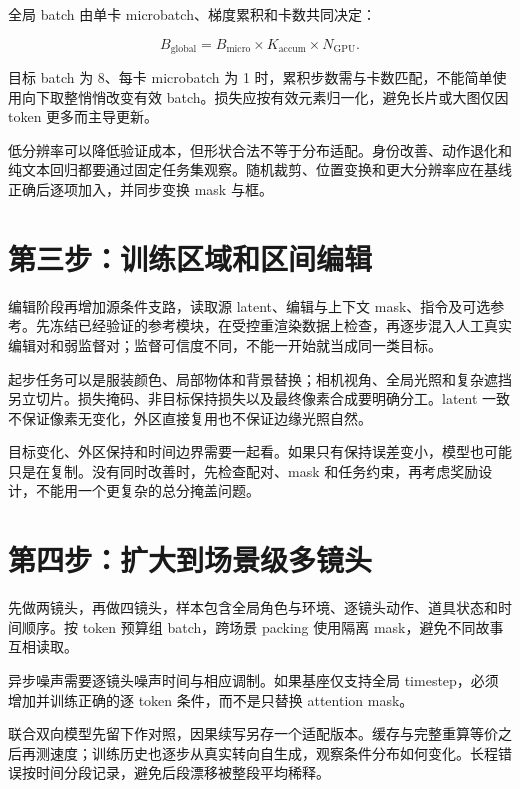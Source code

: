 全局 batch 由单卡 microbatch、梯度累积和卡数共同决定：

\[
B_{\mathrm{global}}=B_{\mathrm{micro}}\times K_{\mathrm{accum}}\times N_{\mathrm{GPU}}.
\]

目标 batch 为 8、每卡 microbatch 为 1 时，累积步数需与卡数匹配，不能简单使用向下取整悄悄改变有效 batch。损失应按有效元素归一化，避免长片或大图仅因 token 更多而主导更新。

低分辨率可以降低验证成本，但形状合法不等于分布适配。身份改善、动作退化和纯文本回归都要通过固定任务集观察。随机裁剪、位置变换和更大分辨率应在基线正确后逐项加入，并同步变换 mask 与框。

\section{第三步：训练区域和区间编辑}\label{seedance-m13-ux7b2cux4e09ux6b65ux8badux7ec3ux533aux57dfux548cux533aux95f4ux7f16ux8f91}

编辑阶段再增加源条件支路，读取源 latent、编辑与上下文 mask、指令及可选参考。先冻结已经验证的参考模块，在受控重渲染数据上检查，再逐步混入人工真实编辑对和弱监督对；监督可信度不同，不能一开始就当成同一类目标。

起步任务可以是服装颜色、局部物体和背景替换；相机视角、全局光照和复杂遮挡另立切片。损失掩码、非目标保持损失以及最终像素合成要明确分工。latent 一致不保证像素无变化，外区直接复用也不保证边缘光照自然。

目标变化、外区保持和时间边界需要一起看。如果只有保持误差变小，模型也可能只是在复制。没有同时改善时，先检查配对、mask 和任务约束，再考虑奖励设计，不能用一个更复杂的总分掩盖问题。

\section{第四步：扩大到场景级多镜头}\label{seedance-m13-ux7b2cux56dbux6b65ux6269ux5927ux5230ux573aux666fux7ea7ux591aux955cux5934}

先做两镜头，再做四镜头，样本包含全局角色与环境、逐镜头动作、道具状态和时间顺序。按 token 预算组 batch，跨场景 packing 使用隔离 mask，避免不同故事互相读取。

异步噪声需要逐镜头噪声时间与相应调制。如果基座仅支持全局 timestep，必须增加并训练正确的逐 token 条件，而不是只替换 attention mask。

联合双向模型先留下作对照，因果续写另存一个适配版本。缓存与完整重算等价之后再测速度；训练历史也逐步从真实转向自生成，观察条件分布如何变化。长程错误按时间分段记录，避免后段漂移被整段平均稀释。

